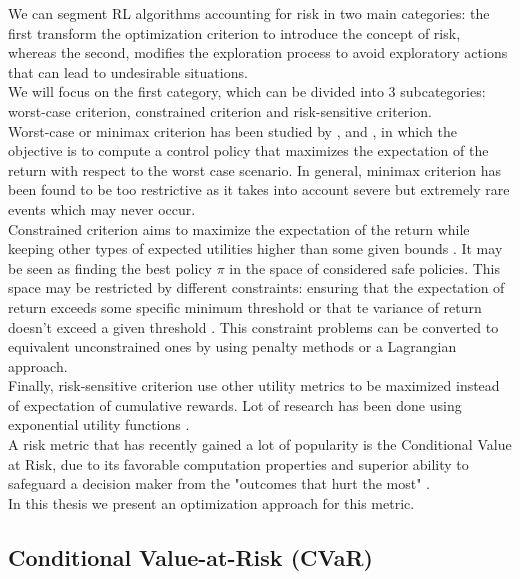 We can segment RL algorithms accounting for risk in two main categories: the first transform 
the optimization criterion to introduce the concept of risk, whereas the second, modifies the exploration
process to avoid exploratory actions that can lead to undesirable situations.\\
We will focus on the first category, which can be divided into 3 subcategories: worst-case criterion,
constrained criterion and risk-sensitive criterion.\\
Worst-case or minimax criterion has been studied by \citet{Heger1994}, \citet{Coraluppi1997} and \citet{Coraluppi1999},
in which the objective is to compute a control policy that maximizes the expectation of the return
with respect to the worst case scenario. In general, minimax criterion has been found to be too restrictive as it takes into
account severe but extremely rare events which may never occur.\\
Constrained criterion  aims to maximize the expectation of the return while keeping other types of expected
utilities higher than some given bounds \citep{Altman1993}. It may be seen as finding the best policy $\pi$
in the space of considered safe policies. This space may be restricted by different constraints: ensuring that
the expectation of return exceeds some specific minimum threshold \citep{Geibel2006}
or that te variance of return doesn't exceed a given threshold \citep{Tamar2012}. This constraint problems
can be converted to equivalent unconstrained ones by using penalty methods or a Lagrangian approach.\\
Finally, risk-sensitive criterion use other utility metrics to be maximized instead of expectation of cumulative rewards.
Lot of research has been done using exponential utility functions \citep{Howard1972,Chung1987}. \\
A risk metric that has recently gained a lot of popularity is the Conditional Value at Risk,
due to its favorable computation properties and superior ability to safeguard a
decision maker from the "outcomes that hurt the most" \cite{Serraino2013}.\\
In this thesis we present an optimization approach for this metric.

\subsection{Conditional Value-at-Risk (CVaR)}

